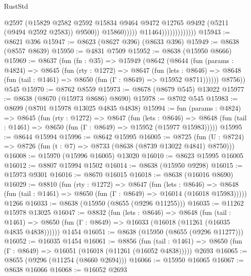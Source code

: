 \begin{lexlean}{RustStd}
\begin{coremodule}
                                          @2597
                                          (@15829
                                            @2582
                                            @2592
                                            @15834
                                            @9464
                                            @9472
                                            @12765
                                            @9492
                                            (@5211 (@9494 @2592 @2583))
                                            @9500))
                                        @15860)))))
                              @11464)))))))))))))
@15943 := @8621 @396
@15947 := @8623 (@8627 @396) (@8633 @396)
@15949 := @8638 (@8557 @8639)
@15950 := @4831 @7509
@15952 := @8638 (@15950 @8666)
@15969 := @8637
    (fun (fn : @35) =>
    @15949
      (@8642
        (@8644
          (fun (params : @4824) =>
          @8645
            (fun (rty : @1272) =>
            @8647
              (fun (lets : @8646) =>
              @8648 (fun (tail : @1461) => @8650 (fun (Γ : @8649) => @15952 @8711))))))
        @8756))
    @545
@15970 := @8762 @8559
@15973 := @8678 (@8679 @545) @13022
@15977 := @8638 (@8670 (@15973 @8686) @8690)
@15978 := @8702 @545
@15983 := @8699 (@8701 @15978 @13025 @4835 @4838)
@15994 := fun (params : @4824) =>
  @8645
    (fun (rty : @1272) =>
    @8647
      (fun (lets : @8646) =>
      @8648 (fun (tail : @1461) => @8650 (fun (Γ : @8649) => @15952 (@15977 @15983)))))
@15995 := @8644 @15994
@15996 := @8642 @15995
@16005 := @8725
    (fun (U : @8724) => @8726 (fun (t : @7) => @8733 (@8638 (@8739 @13022 @4841) @8750)))
@16008 := @15970 (@15996 @16005) @13020
@16010 := @8623 @15995 @16005
@16012 := @8807 @15994 @1502
@16014 := @8638 (@15950 @9298)
@16015 := @15973 @9301
@16016 := @8670 @16015
@16018 := @8638 (@16016 @8690)
@16029 := @8810
    (fun (rty : @1272) =>
    @8647
      (fun (lets : @8646) =>
      @8648 (fun (tail : @1461) => @8650 (fun (Γ : @8649) => @16014 (@16018 @15983)))))
    @1266
@16033 := @8638 (@15950 (@8655 (@9296 @11255)))
@16035 := @11262 @15978 @13025
@16047 := @8832
    (fun (lets : @8646) =>
    @8648
      (fun (tail : @1461) =>
      @8650 (fun (Γ : @8649) => @16033 (@16018 (@11261 (@16035 @4835 @4838))))))
    @1454
@16051 := @8638 (@15950 (@8655 (@9296 @11277)))
@16052 := @16035 @1454
@16061 := @8856
    (fun (tail : @1461) => @8650 (fun (Γ : @8649) => @16051 (@16018 (@11261 (@16052 @4838)))))
    @2693
@16065 := @8655 (@9296 (@11254 (@8660 @2694)))
@16066 := @15950 @16065
@16067 := @8638 @16066
@16068 := @16052 @2693

\end{coremodule}
\end{lexlean}
